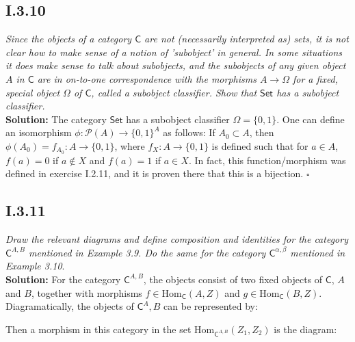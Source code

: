 \documentclass[11pt,a4paper]{article}
\newcommand{\morph}[3]{\text{Hom}_{#1}(#2,#3)}
\begin{document}
\subsection*{I.3.10} \textit{Since the objects of a category $\textsf{C}$ are not (necessarily interpreted as) sets, it is not clear how to make sense of a notion of 'subobject' in general.  In some situations it does make sense to talk about subobjects, and the subobjects of any given object $A$ in $\textsf{C}$ are in on-to-one correspondence with the morphisms $A \rightarrow \Omega$ for a fixed, special object $\Omega$ of $\textsf{C}$, called a subobject classifier.  Show that $\textsf{Set}$ has a subobject classifier.} \\

\noindent \textbf{Solution: } The category $\textsf{Set}$ has a subobject classifier $\Omega = \{0,1\}$.  One can define an isomorphism $\phi: \mathcal{P}(A) \rightarrow \{0,1\}^A$ as follows: If $A_0 \subset A$, then $\phi(A_0) = f_{A_0}: A \rightarrow \{0,1\}$, where $f_X:A \rightarrow \{0,1\}$ is defined such that for $a \in A$, $f(a) = 0$ if $a \notin X$ and $f(a) = 1$ if $a \in X$.  In fact, this function/morphism was defined in exercise I.2.11, and it is proven there that this is a bijection. $\square$

\subsection*{I.3.11} \textit{Draw the relevant diagrams and define composition and identities for the category $\textsf{C}^{A,B}$ mentioned in Example 3.9.  Do the same for the category $\textsf{C}^{\alpha, \beta}$ mentioned in Example 3.10}. \\

\noindent \textbf{Solution: }  For the category $\textsf{C}^{A,B}$, the objects consist of two fixed objects of $\textsf{C}$, $A$ and $B$, together with morphisms $f \in \morph{\textsf{C}}{A}{Z}$ and $g \in \morph{\textsf{C}}{B}{Z}$.  Diagramatically, the objects of $\textsf{C}^A,B$ can be represented by:

\begin{center}
\end{center}

\noindent Then a morphism in this category in the set $\morph{\textsf{C}^{A,B}}{Z_1}{Z_2}$ is the diagram:
\end{document}
